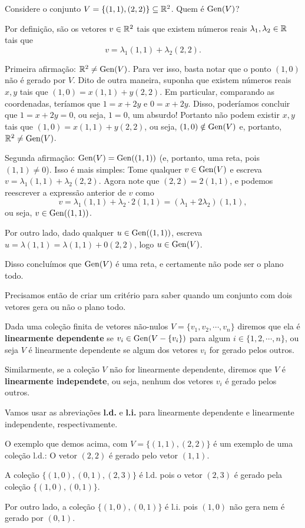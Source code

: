 \begin{ex}
	Considere o conjunto $V=\{(1,1),(2,2)\}\subseteq\mathbb R^2$. Quem é $\operatorname{Gen}(V)$?
	
	Por definição, são os vetores $v\in \mathbb R^2$ tais que existem números reais $\lambda_1,\lambda_2\in\mathbb R$ tais que \[v=\lambda_1(1,1)+\lambda_2(2,2).\]
	
	Primeira afirmação: $\mathbb R^2\neq \operatorname{Gen}(V)$. Para ver isso, basta notar que o ponto $(1,0)$ não é gerado por $V$. Dito de outra maneira, suponha que existem números reais $x,y$ tais que $(1,0)=x(1,1)+y(2,2)$. Em particular, comparando as coordenadas, teríamos que $1=x+2y$ e $0=x+2y$. Disso, poderíamos concluir que $1=x+2y=0$, ou seja, $1=0$, um absurdo! Portanto não podem existir $x,y$ tais que $(1,0)=x(1,1)+y(2,2)$, ou seja, $(1,0)\notin\operatorname{Gen}(V)$ e, portanto, $\mathbb R^2\neq \operatorname{Gen} (V)$.
	
	Segunda afirmação: $\operatorname{Gen}(V)=\operatorname{Gen}((1,1))$ (e, portanto, uma reta, pois $(1,1)\neq 0$). Isso é mais simples: Tome qualquer $v\in \operatorname{Gen}(V)$ e escreva $v=\lambda_1(1,1)+\lambda_2(2,2)$. Agora note que $(2,2)=2(1,1)$, e podemos reescrever a expressão anterior de $v$ como
	\[v=\lambda_1(1,1)+\lambda_2\cdot 2(1,1)=(\lambda_1+2\lambda_2)(1,1),\]ou seja, $v\in\operatorname{Gen} ((1,1))$. 
	
	Por outro lado, dado qualquer $u\in\operatorname{Gen}((1,1))$, escreva $u=\lambda (1,1)=\lambda(1,1)+0(2,2)$, logo $u\in\operatorname{Gen}(V)$.
	
	Disso concluímos que $\operatorname{Gen}(V)$ é uma reta, e certamente não pode ser o plano todo.
\end{ex}

Precisamos então de criar um critério para saber quando um conjunto com dois vetores gera ou não o plano todo.

\begin{df}
	Dada uma coleção finita de vetores não-nulos $V=\{v_1,v_2,\cdots,v_n\}$ diremos que ela é \textbf{linearmente dependente} se $v_i\in\operatorname{Gen}(V-\{v_i\})$ para algum $i\in\{1,2,\cdots,n\}$, ou seja $V$ é linearmente dependente se algum dos vetores $v_i$ for gerado pelos outros.
	
	Similarmente, se a coleção $V$ não for linearmente dependente, diremos que $V$ é \textbf{linearmente independete}, ou seja, nenhum dos vetores $v_i$ é gerado pelos outros.
\end{df}

\begin{rmk}
	Vamos usar as abreviações \textbf{l.d.} e \textbf{l.i.} para linearmente dependente e linearmente independente, respectivamente.
\end{rmk}
\begin{ex}
	O exemplo que demos acima, com $V=\{(1,1),(2,2)\}$ é um exemplo de uma coleção l.d.: O vetor $(2,2)$ é gerado pelo vetor $(1,1)$.
	
	\tcblower
	A coleção $\{(1,0),(0,1),(2,3)\}$ é l.d. pois o vetor $(2,3)$ é gerado pela coleção $\{(1,0),(0,1)\}$.
	
	Por outro lado, a coleção $\{(1,0),(0,1)\}$ é l.i. pois $(1,0)$ não gera nem é gerado por $(0,1)$.
\end{ex}

